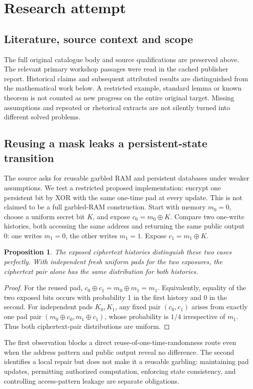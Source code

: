 \documentclass[11pt]{article}
\newtheorem{proposition}{Proposition}
\begin{document}
\section{Research attempt}
\subsection{Literature, source context and scope}
The full original catalogue body and source qualifications are preserved above. The relevant primary workshop passages were read in the cached publisher report. Historical claims and subsequent attributed results are distinguished from the mathematical work below. A restricted example, standard lemma or known theorem is not counted as new progress on the entire original target. Missing assumptions and repeated or rhetorical extracts are not silently turned into different solved problems.

\subsection{Reusing a mask leaks a persistent-state transition}
The source asks for reusable garbled RAM and persistent databases under weaker assumptions. We test a restricted proposed implementation: encrypt one persistent bit by XOR with the same one-time pad at every update. This is not claimed to be a full garbled-RAM construction.
Start with memory $m_0=0$, choose a uniform secret bit $K$, and expose $c_0=m_0\oplus K$. Compare two one-write histories, both accessing the same address and returning the same public output 0: one writes $m_1=0$, the other writes $m_1=1$. Expose $c_1=m_1\oplus K$.
\begin{proposition}
The exposed ciphertext histories distinguish these two cases perfectly. With independent fresh uniform pads for the two exposures, the ciphertext pair alone has the same distribution for both histories.
\end{proposition}
\begin{proof}
For the reused pad, $c_0\oplus c_1=m_0\oplus m_1=m_1$. Equivalently, equality of the two exposed bits occurs with probability 1 in the first history and 0 in the second. For independent pads $K_0,K_1$, any fixed pair $(c_0,c_1)$ arises from exactly one pad pair $(m_0\oplus c_0,m_1\oplus c_1)$, whose probability is $1/4$ irrespective of $m_1$. Thus both ciphertext-pair distributions are uniform.
\end{proof}
The first observation blocks a direct reuse-of-one-time-randomness route even when the address pattern and public output reveal no difference. The second identifies a local repair but does not make it a reusable garbling: maintaining pad updates, permitting authorized computation, enforcing state consistency, and controlling access-pattern leakage are separate obligations.
\end{document}
